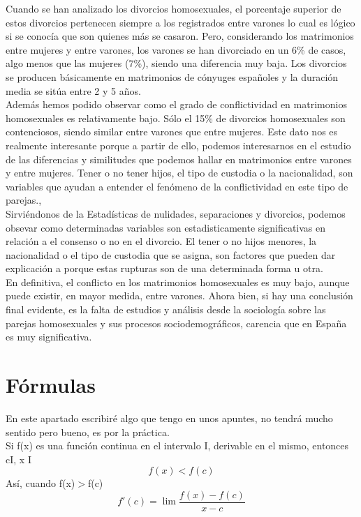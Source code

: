 \documentclass{article}
\begin{document}
Cuando se han analizado los divorcios homosexuales, el porcentaje superior de estos
divorcios pertenecen siempre a los registrados entre varones lo cual es lógico si se
conocía que son quienes más se casaron. Pero, considerando los matrimonios entre
mujeres y entre varones, los varones se han divorciado en un 6\% de casos, algo menos
que las mujeres (7\%), siendo una diferencia muy baja. Los divorcios se producen
básicamente en matrimonios de cónyuges españoles y la duración media se sitúa entre 2
y 5 años\cite{gartrell2011family}.\\

Además hemos podido observar como el grado de conflictividad en matrimonios
homosexuales es relativamente bajo. Sólo el 15\% de divorcios homosexuales son
contenciosos, siendo similar entre varones que entre mujeres. Este dato nos es realmente
interesante porque a partir de ello, podemos interesarnos en el estudio de las diferencias
y similitudes que podemos hallar en matrimonios entre varones y entre mujeres. Tener o
no tener hijos, el tipo de custodia o la nacionalidad, son variables que ayudan a entender
el fenómeno de la conflictividad en este tipo de parejas.,\\

Sirviéndonos de la Estadísticas de nulidades, separaciones y divorcios, podemos
obsevar como determinadas variables son estadisticamente significativas en relación a el
consenso o no en el divorcio. El tener o no hijos menores, la nacionalidad o el tipo de
custodia que se asigna, son factores que pueden dar explicación a porque estas rupturas
son de una determinada forma u otra.\\

En definitiva, el conflicto en los matrimonios homosexuales es muy bajo, aunque puede
existir, en mayor medida, entre varones. Ahora bien, si hay una conclusión final
evidente, es la falta de estudios y análisis desde la sociología sobre las parejas
homosexuales y sus procesos sociodemográficos, carencia que en España es muy
significativa.

\section{Fórmulas}
En este apartado escribiré algo que tengo en unos apuntes, no tendrá mucho sentido pero bueno, es por la práctica.\\

 Si f(x) es una función continua en el intervalo I, derivable en el mismo, entonces \exists c\epsilon I, 
\forall x \exists I\\

\begin{equation}
f(x)<f(c) 
\end{equation}
 Así, cuando f(x)$>$f(c)
\begin{equation}
	f'(c)=\lim \frac{f(x)-f(c)}{x-c}
\end{equation}


\end{document}
